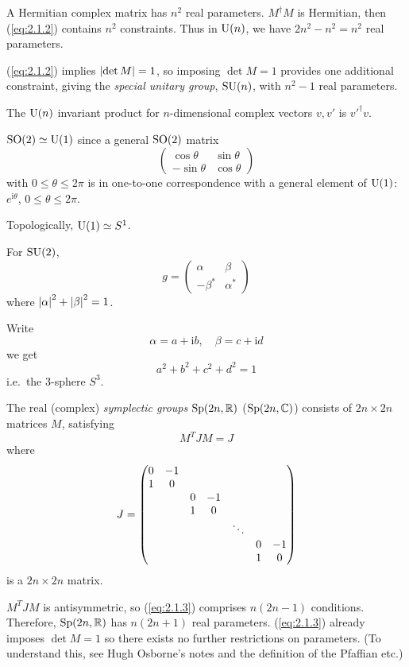 \documentclass[a4paper,11pt]{article}
\begin{document}
	A Hermitian complex matrix has $n^2$ real parameters. $M^\dagger M$ is Hermitian, then (\ref{eq:2.1.2}) contains $n^2$ constraints. Thus in $\operatorname{U}(n)$, we have $2n^2 - n^2 = n^2$ real parameters. 
	
	(\ref{eq:2.1.2}) implies $\abs{\det M} = 1$, so imposing $\det M = 1$ provides one additional constraint, giving the \emph{special unitary group}, $\operatorname{SU}(n)$, with $n^2 - 1$ real parameters.

	The $\operatorname{U}(n)$ invariant product for $n$-dimensional complex vectors $v,v'$ is $v'^\dagger v$.
	

	\begin{ex}
		$\operatorname{SO}(2) \simeq \operatorname{U}(1)$ since a general $\operatorname{SO}(2)$ matrix
		\[
			\begin{pmatrix}
				\cos \theta & \sin \theta\\
				-\sin \theta & \cos \theta
			\end{pmatrix}
		\]
		with $0 \leq \theta \leq 2 \pi$ is in one-to-one correspondence with a general element of $\operatorname{U}(1)$: $e ^{\mathrm{i} \theta}$, $0 \leq \theta \leq 2 \pi$.

		Topologically, $\operatorname{U}(1) \simeq S^1$.

		For $\operatorname{SU}(2)$,
		\[
			g = \begin{pmatrix}
				\alpha & \beta\\
				-\beta^* & \alpha^*
			\end{pmatrix}
		\]
		where $\abs{\alpha}^2 + \abs{\beta}^2 = 1$.

		Write 
		\[
			\alpha = a + \mathrm{i} b, \quad \beta = c + \mathrm{i} d
		\]
		we get
		\[
			a^2 + b^2 + c^2 + d^2 = 1
		\]
		i.e.\ the 3-sphere $S^3$.
	\end{ex}


	\begin{defi}
		The real (complex) \emph{symplectic groups} $\operatorname{Sp}(2n,\mathbb{R})$ ($\operatorname{Sp}(2n, \mathbb{C})$) consists of $2n \times 2n$ matrices $M$, satisfying
		\begin{equation}
			M^T J M = J
			\label{eq:2.1.3}
		\end{equation}
		where
		\[
			J = \mqty(\dmat{0 & -1\\1 & 0,0 & -1\\1 & 0, \ddots, 0 & -1\\1 & 0})
		\]
		is a $2n \times 2n$ matrix.
	\end{defi}

	$M^T J M$ is antisymmetric, so (\ref{eq:2.1.3}) comprises $n(2n-1)$ conditions. Therefore, $\operatorname{Sp}(2n,\mathbb{R})$ has $n(2n+1)$ real parameters. (\ref{eq:2.1.3}) already imposes $\det M = 1$ so there exists no further restrictions on parameters. (To understand this, see Hugh Osborne's notes and the definition of the Pfaffian etc.)
\end{document}
